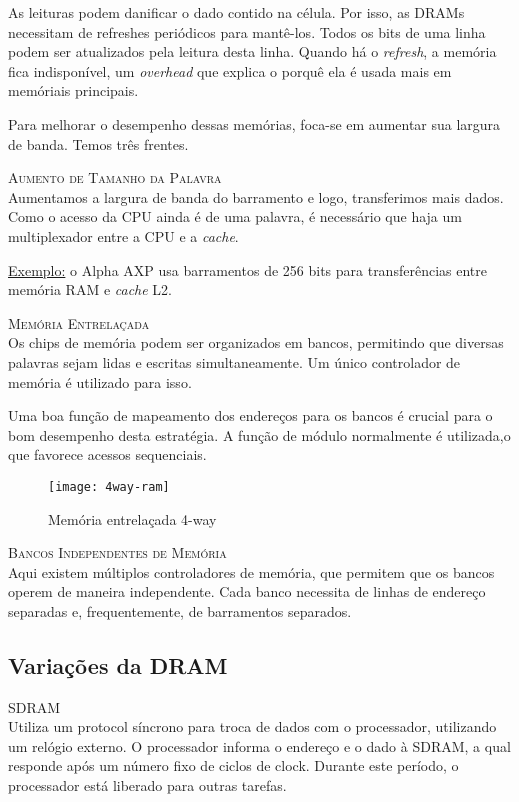 As leituras podem danificar o dado contido na célula. Por isso, as DRAMs necessitam de refreshes periódicos para mantê-los. Todos os bits de uma linha podem ser atualizados pela leitura desta linha. Quando há o \textit{refresh}, a memória fica indisponível, um \textit{overhead} que explica o porquê ela é usada mais em memóriais principais.

Para melhorar o desempenho dessas memórias, foca-se em aumentar sua largura de banda. Temos três frentes.

\textsc{Aumento de Tamanho da Palavra}\\
Aumentamos a largura de banda do barramento e logo, transferimos mais dados. Como o acesso da CPU ainda é de uma palavra, é necessário que haja um multiplexador entre a CPU e a \textit{cache}.

\underline{Exemplo:} o Alpha AXP usa barramentos de 256 bits para transferências entre memória RAM e \textit{cache} L2.


\textsc{Memória Entrelaçada}\\
Os chips de memória podem ser organizados em bancos, permitindo que diversas palavras sejam lidas e escritas simultaneamente. Um único controlador de memória é utilizado para isso.

Uma boa função de mapeamento dos endereços para os bancos é crucial para o bom desempenho desta estratégia. A função de módulo normalmente é utilizada,o que favorece acessos sequenciais.

\begin{figure}[ht]
  \centering
  \texttt{[image: 4way-ram]}
  \caption{Memória entrelaçada 4-way}
  \label{fig:fourway-ram}
\end{figure}

\textsc{Bancos Independentes de Memória}\\
Aqui existem múltiplos controladores de memória, que permitem que os bancos operem de maneira independente. Cada banco necessita de linhas de endereço separadas e, frequentemente, de barramentos separados.

\subsection{Variações da DRAM}

\textsc{SDRAM}\\
Utiliza um protocol síncrono para troca de dados com o processador, utilizando um relógio externo. O processador informa o endereço e o dado à SDRAM, a qual responde após um número fixo de ciclos de clock. Durante este período, o processador está liberado para outras tarefas.

